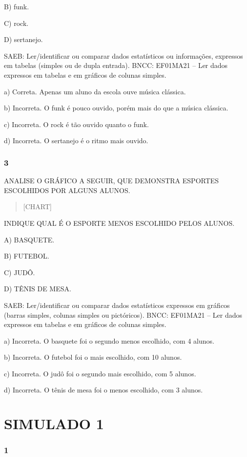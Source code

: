 B) funk.

C) rock.

D) sertanejo.

SAEB: Ler/identificar ou comparar dados estatísticos ou informações, expressos
em tabelas (simples ou de dupla entrada).
BNCC: EF01MA21 -- Ler dados expressos em tabelas e em gráficos de colunas
simples.

a) Correta. Apenas um aluno da escola ouve música clássica.

b) Incorreta. O funk é pouco ouvido, porém mais do que a música
clássica.

c) Incorreta. O rock é tão ouvido quanto o funk.

d) Incorreta. O sertanejo é o ritmo mais ouvido.

\subsubsection{3}\label{section-86}

ANALISE O GRÁFICO A SEGUIR, QUE DEMONSTRA ESPORTES ESCOLHIDOS POR ALGUNS ALUNOS.

\begin{quote}
{{[}CHART{]}}
\end{quote}

INDIQUE QUAL É O ESPORTE MENOS ESCOLHIDO PELOS ALUNOS.

A) BASQUETE.

B) FUTEBOL.

C) JUDÔ.

D) TÊNIS DE MESA.

SAEB:
Ler/identificar ou comparar dados estatísticos expressos em gráficos
(barras simples, colunas simples ou pictóricos).
BNCC: EF01MA21 -- Ler dados expressos em tabelas e em gráficos de colunas
simples.

a) Incorreta. O basquete foi o segundo menos escolhido, com 4 alunos.

b) Incorreta. O futebol foi o mais escolhido, com 10 alunos.

c) Incorreta. O judô foi o segundo mais escolhido, com 5 alunos.

d) Incorreta. O tênis de mesa foi o menos escolhido, com 3 alunos.

\section{SIMULADO 1}\label{simulado-1}

\subsubsection{1}\label{section-87}

